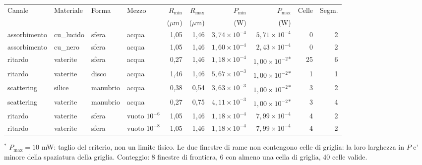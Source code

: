 \begingroup\scriptsize\setlength{\tabcolsep}{1pt}
\begin{tabular}{|l|l|l|l|r|r|r|r|r|r|}
\hline
Canale & Materiale & Forma & Mezzo & $R_{\min}$ & $R_{\max}$ & $P_{\min}$ & $P_{\max}$ & Celle & Segm. \\
 &  &  &  & ($\mu$m) & ($\mu$m) & (W) & (W) &  & \\
\hline
assorbimento & cu\_lucido & sfera & acqua & 1{,}05 & 1{,}46 & $3{,}74\times10^{-4}$ & $5{,}71\times10^{-4}$ & 0 & 2 \\
assorbimento & cu\_nero & sfera & acqua & 1{,}05 & 1{,}46 & $1{,}60\times10^{-4}$ & $2{,}43\times10^{-4}$ & 0 & 2 \\
ritardo & vaterite & sfera & acqua & 0{,}27 & 1{,}46 & $1{,}18\times10^{-4}$ & $1{,}00\times10^{-2}$\textsuperscript{$\ast$} & 25 & 6 \\
ritardo & vaterite & disco & acqua & 1{,}46 & 1{,}46 & $5{,}67\times10^{-3}$ & $1{,}00\times10^{-2}$\textsuperscript{$\ast$} & 1 & 1 \\
scattering & silice & manubrio & acqua & 0{,}38 & 0{,}54 & $3{,}63\times10^{-3}$ & $1{,}00\times10^{-2}$\textsuperscript{$\ast$} & 3 & 2 \\
scattering & vaterite & manubrio & acqua & 0{,}27 & 0{,}75 & $4{,}11\times10^{-3}$ & $1{,}00\times10^{-2}$\textsuperscript{$\ast$} & 3 & 4 \\
\hline
ritardo & vaterite & sfera & vuoto $10^{-6}$ & 1{,}05 & 1{,}46 & $1{,}18\times10^{-4}$ & $7{,}99\times10^{-4}$ & 4 & 2 \\
\hline
ritardo & vaterite & sfera & vuoto $10^{-8}$ & 1{,}05 & 1{,}46 & $1{,}18\times10^{-4}$ & $7{,}99\times10^{-4}$ & 4 & 2 \\
\hline
\end{tabular}
\endgroup

\par\smallskip\noindent\footnotesize $^{\ast}$ $P_{\max}=10$ mW: taglio del criterio, non un limite fisico. Le due finestre di rame non contengono celle di griglia: la loro larghezza in $P$ e' minore della spaziatura della griglia. Conteggio: 8 finestre di frontiera, 6 con almeno una cella di griglia, 40 celle valide.
